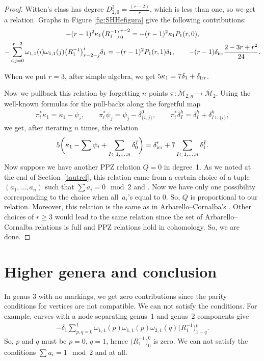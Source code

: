 \documentclass[pdftex]{sigma}
\def\oM{\overline{\mathcal{M}}}
\numberwithin{equation}{section}
\begin{document}
\begin{proof}
Witten's class has degree
$D^3_{2,0} = \frac{(r-2)}{r}$,
which is less than one, so we get a relation. Graphs in Figure \ref{fig:SHHefigura} give the following contributions:
\begin{gather*}
	-(r-1)^2\kappa_1 \big(R_1^{-1}\big)^{r-2}_0 = -(r-1)^2 \kappa_1 P_1(r,0),
\\
- \sum_{i,j=0}^{r-2}\omega_{1,1}(i)\omega_{1,1}(j)\big(R_1^{-1}\big)^{i}_{r-2-j}\delta_1 = -(r-1)^2 P_1(r,1) \delta_1	,
\qquad
	-(r-1)\delta_{\rm irr} \frac{2-3r+r^2}{24} .
\end{gather*}

When we put $r=3$, after simple algebra, we get
$5\kappa_1 = 7\delta_1 + \delta_{\rm irr}$.

Now we pullback this relation by forgetting $n$ points $\pi\colon \oM_{2,n} \rightarrow \oM_{2}$.
Using the well-known formulas for the pull-backs along the forgetful map
\begin{align*}
 \pi_i^*\kappa_1 = \kappa_1 - \psi_i,\qquad
 \pi_i^*\psi_j = \psi_j - \delta^0_{\{i,j\}},\qquad
 \pi_i^*\delta^h_I = \delta^h_I + \delta^h_{I\cup\{i\}},
\end{align*}
we get, after iterating $n$ times, the relation
\begin{align*}
	5\bigg(\kappa_1 - \sum \psi_i + \sum_{I\subset{1,\dots,n}}\delta_0^{I}\bigg) = \delta_{\rm irr}^{\prime} + 7\sum_{I\subset{1,\dots,n}}\delta_1^{I}.
\end{align*}
 Now suppose we have another PPZ relation $Q=0$ in degree~1. As we noted at the end of Section~\ref{tautrel}, this relation came from a certain choice of a tuple $(a_1,\dots, a_n)$ such that $\sum a_i = 0 \mod 2$ and . Now we have only one possibility corresponding to the choice when all~$a_i$'s equal to 0. So, $Q$ is proportional to our relation. Moreover, this relation is the same as in Arbarello--Cornalba's \cite[Theorem 2.2]{Cor}. Other choices of $r\geq3$ would lead to the same relation since the set of Arbarello--Cornalba relations is full and PPZ relations hold in cohomology. So, we are done.
\end{proof}

\section{Higher genera and conclusion}

In genus 3 with no markings, we get zero contributions since the parity conditions for vertices are not compatible. We can not satisfy the conditions. For example, curves with a node separating genus~1 and genus~2 components give
\begin{align*}
-\delta_1\sum_{p,q=0}^1\omega_{1,1}(p)\omega_{1,1}(p)\omega_{2,1}(q)\big(R_1^{-1}\big)^p_{1-q}.
\end{align*}
So, $p$ and $q$ must be $p=0$, $q=1$, hence $\big(R_1^{-1}\big)^0_{0}$ is zero. We can not satisfy the conditions ${\sum a_i = 1 \mod 2}$ and  at all.
\end{document}
